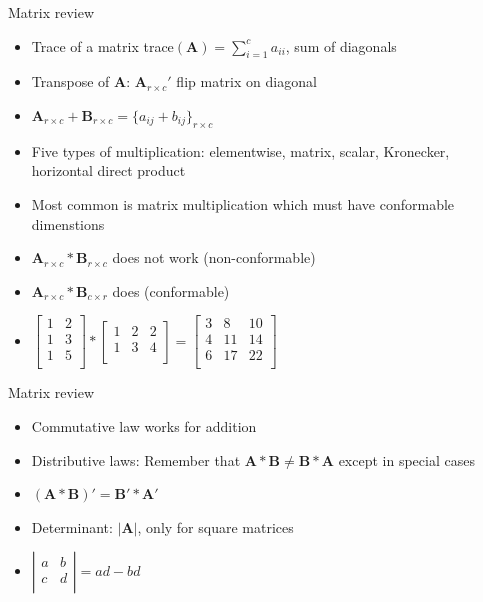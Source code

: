\documentclass[handout,x11names,unknownkeysallowed]{beamer}
\begin{document}
\begin{frame}
Matrix review
\begin{itemize}
\item Trace of a matrix trace$(\bm{A}) = \sum_{i=1}^c a_{ii}$, sum of diagonals
\item Transpose of $\bm{A}$: $\bm{A}_{r \times c}'$ flip matrix on diagonal
\item $\bm{A}_{r \times c} + \bm{B}_{r \times c} = \{a_{ij} + b_{ij}\}_{r \times c}$
\item Five types of multiplication: elementwise, matrix, scalar, Kronecker, horizontal direct product 
\item Most common is matrix multiplication which must have conformable dimenstions
\item $\bm{A}_{r \times c} \ast \bm{B}_{r \times c}$ does not work (non-conformable)
\item $\bm{A}_{r \times c} \ast \bm{B}_{c \times r}$ does (conformable)
\item $	\left[ \begin{array}{cc} 1 & 2 \\ 1 & 3 \\ 1 & 5 \\ \end{array}\right] \ast 
				\left[ \begin{array}{ccc} 1 & 2 & 2\\ 1 & 3 & 4 \\ \end{array}\right] 
			= \left[ \begin{array}{ccc} 3 & 8 & 10 \\ 4 & 11 & 14 \\  6 & 17 & 22 \\ \end{array}\right]$

\end{itemize}
\end{frame}


\begin{frame}
Matrix review
\begin{itemize}
\item Commutative law works for addition
\item Distributive laws:  Remember that $\bm{A} \ast \bm{B} \neq \bm{B} \ast \bm{A} $ except in special cases
\item $(\bm{A} \ast \bm{B})' = \bm{B}' \ast \bm{A}'$
\item Determinant: $|\bm{A}|$, only for square matrices
\item $	\left| \begin{array}{cc} a & b \\ c & d \\ \end{array}\right| = ad-bd$
\end{itemize}
\end{frame}
\end{document}
